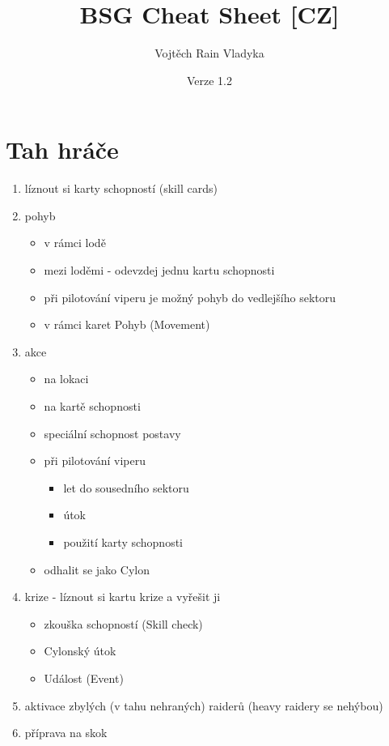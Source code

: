 \documentclass[a4paper,twocolumn]{article}
\begin{document}
    \renewcommand{\arraystretch}{1.5}

\footnotesize

\title{BSG Cheat Sheet [CZ]}
\author{Vojtěch Rain Vladyka}
\date{Verze 1.2}

\maketitle

\section{Tah hráče}
\begin{enumerate}
\item líznout si karty schopností (skill cards)
\item pohyb 
	\begin{itemize}
	\item v rámci lodě 
	\item mezi loděmi - odevzdej jednu kartu schopnosti
	\item při pilotování viperu je možný pohyb do vedlejšího sektoru
	\item v rámci karet Pohyb (Movement)
	\end{itemize}
\item akce 
	\begin{itemize}
	\item na lokaci
	\item na kartě schopnosti
	\item speciální schopnost postavy
	\item při pilotování viperu
		\begin{itemize}
		\item let do sousedního sektoru
		\item útok
		\item použití karty schopnosti
		\end{itemize}
	\item odhalit se jako Cylon
	\end{itemize}
\item krize - líznout si kartu krize a vyřešit ji
	\begin{itemize}
	\item zkouška schopností (Skill check)
	\item Cylonský útok
	\item Událost (Event)
	\end{itemize}
\item aktivace zbylých (v tahu nehraných) raiderů (heavy raidery se nehýbou)
\item příprava na skok
\end{enumerate}
\end{document}

